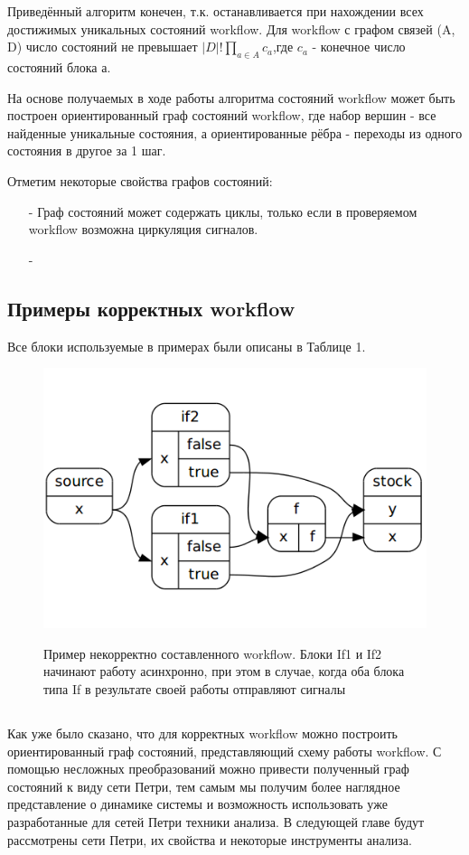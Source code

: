 \documentclass[a4paper,12pt]{article}
\begin{document}
 Приведённый алгоритм конечен, т.к. останавливается при нахождении всех достижимых уникальных состояний workflow. Для workflow с графом связей (A, D) число состояний не превышает $|D|!\prod_{a \in A} c_{a}$,где  $c_{a}$ - конечное число состояний блока а.

На основе получаемых в ходе работы алгоритма состояний workflow может быть построен ориентированный граф состояний workflow, где набор вершин - все найденные уникальные состояния, а ориентированные рёбра - переходы из одного состояния в другое за 1 шаг.

Отметим некоторые свойства графов состояний:
\begin{enumerate}
\item[-] Граф состояний может содержать циклы, только если в проверяемом workflow возможна циркуляция сигналов. 
\item[-] 
\end{enumerate}


\subsection*{Примеры корректных workflow}
Все блоки используемые в примерах были описаны в Таблице 1.

\begin{figure}[!h]
\caption{Пример некорректно составленного workflow. Блоки If1 и If2 начинают работу асинхронно, при этом в случае, когда оба блока типа If в результате своей работы отправляют сигналы }
\centering
\includegraphics[scale=0.35]{race_workflow.png}
\label{pic:race_cond}
\end{figure}

\subsection*{}
Как уже было сказано, что для корректных workflow можно построить ориентированный граф состояний, представляющий схему работы workflow.
С помощью несложных преобразований можно привести полученный граф состояний к виду сети Петри, тем самым мы получим более наглядное представление о динамике системы и возможность использовать уже разработанные для сетей Петри техники анализа.
В следующей главе будут рассмотрены сети Петри, их свойства и некоторые инструменты анализа.
\end{document}
